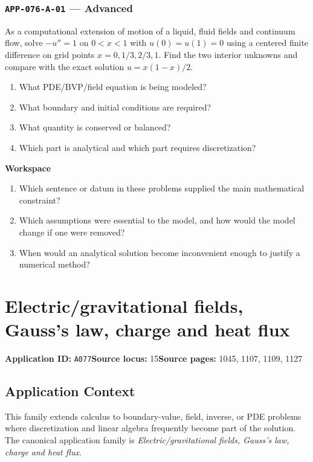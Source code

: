\documentclass[11pt]{book}
\newcommand{\pid}[1]{\texttt{#1}}
\newcommand{\workspace}{\par\vspace{0.7in}\hrulefill\par\vspace{0.55in}\hrulefill\par}
\begin{document}
\subsection*{\pid{APP-076-A-01} — Advanced}
\begin{problembox}
As a computational extension of motion of a liquid, fluid fields and continuum flow, solve $-u''=1$ on $0<x<1$ with $u(0)=u(1)=0$ using a centered finite difference on grid points $x=0,1/3,2/3,1$. Find the two interior unknowns and compare with the exact solution $u=x(1-x)/2$.
\end{problembox}
\begin{promptbox}\begin{enumerate}
\item What PDE/BVP/field equation is being modeled?
\item What boundary and initial conditions are required?
\item What quantity is conserved or balanced?
\item Which part is analytical and which part requires discretization?
\end{enumerate}\end{promptbox}
\textbf{Workspace}\workspace
\begin{reflectionbox}\begin{enumerate}
\item Which sentence or datum in these problems supplied the main mathematical constraint?
\item Which assumptions were essential to the model, and how would the model change if one were removed?
\item When would an analytical solution become inconvenient enough to justify a numerical method?
\end{enumerate}\end{reflectionbox}
\chapter{Electric/gravitational fields, Gauss's law, charge and heat flux}\label{app:A077}
\textbf{Application ID:} \pid{A077}\quad \textbf{Source locus:} 15\quad \textbf{Source pages:} 1045, 1107, 1109, 1127
\section*{Application Context}
This family extends calculus to boundary-value, field, inverse, or PDE problems where discretization and linear algebra frequently become part of the solution. The canonical application family is \emph{Electric/gravitational fields, Gauss's law, charge and heat flux}.
\end{document}
